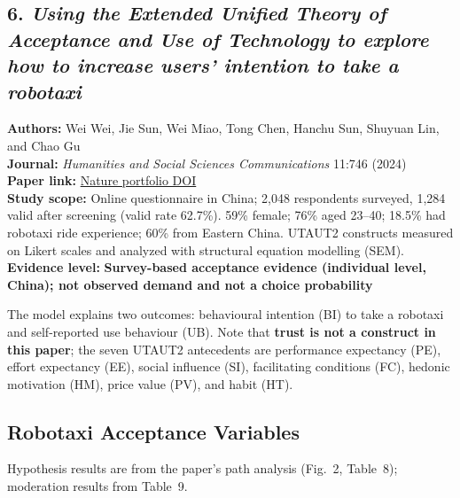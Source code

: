 \documentclass[10pt,a4paper]{article}
\begin{document}
\begin{mdframed}[linecolor=red!60,linewidth=2pt]
\hypertarget{using-the-extended-unified-theory-of-acceptance-and-use-of-technology}{%
\section{\texorpdfstring{6. \emph{Using the Extended Unified Theory of Acceptance and Use of Technology to explore how to increase users' intention to take a robotaxi}}{6. Using the Extended Unified Theory of Acceptance and Use of Technology to explore how to increase users' intention to take a robotaxi}}\label{using-the-extended-unified-theory-of-acceptance-and-use-of-technology}}

\textbf{Authors:} Wei Wei, Jie Sun, Wei Miao, Tong Chen, Hanchu Sun, Shuyuan Lin, and Chao Gu\\
\textbf{Journal:} \emph{Humanities and Social Sciences Communications} 11:746 (2024)\\
\textbf{Paper link:} \href{https://doi.org/10.1057/s41599-024-03271-3}{Nature portfolio DOI}\\
\textbf{Study scope:} Online questionnaire in China; 2,048 respondents surveyed, 1,284 valid after screening (valid rate 62.7\%). 59\% female; 76\% aged 23--40; 18.5\% had robotaxi ride experience; 60\% from Eastern China. UTAUT2 constructs measured on Likert scales and analyzed with structural equation modelling (SEM).\\
\textbf{Evidence level:} \textbf{Survey-based acceptance evidence (individual level, China); not observed demand and not a choice probability}

The model explains two outcomes: behavioural intention (BI) to take a robotaxi and self-reported use behaviour (UB). Note that \textbf{trust is not a construct in this paper}; the seven UTAUT2 antecedents are performance expectancy (PE), effort expectancy (EE), social influence (SI), facilitating conditions (FC), hedonic motivation (HM), price value (PV), and habit (HT).

\hypertarget{robotaxi-acceptance-variables}{%
\subsection{Robotaxi Acceptance Variables}\label{robotaxi-acceptance-variables}}

Hypothesis results are from the paper's path analysis (Fig.~2, Table~8); moderation results from Table~9.


\end{mdframed}
\end{document}
